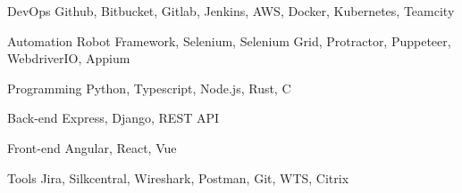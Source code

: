 

\begin{cvskills}

  \cvskill
    {DevOps} %
    {Github, Bitbucket, Gitlab, Jenkins, AWS, Docker, Kubernetes, Teamcity} %
    
    \cvskill
    {Automation} %
    {Robot Framework, Selenium, Selenium Grid, Protractor, Puppeteer, WebdriverIO, Appium } %

\cvskill
	{Programming} %
	{Python, Typescript, Node.js, Rust, C} %

  \cvskill
    {Back-end} %
    {Express, Django, REST API} %

  \cvskill
    {Front-end} %
    {Angular, React, Vue} %
    
  \cvskill
	{Tools} %
	{Jira, Silkcentral, Wireshark, Postman, Git, WTS, Citrix } %

\end{cvskills}
